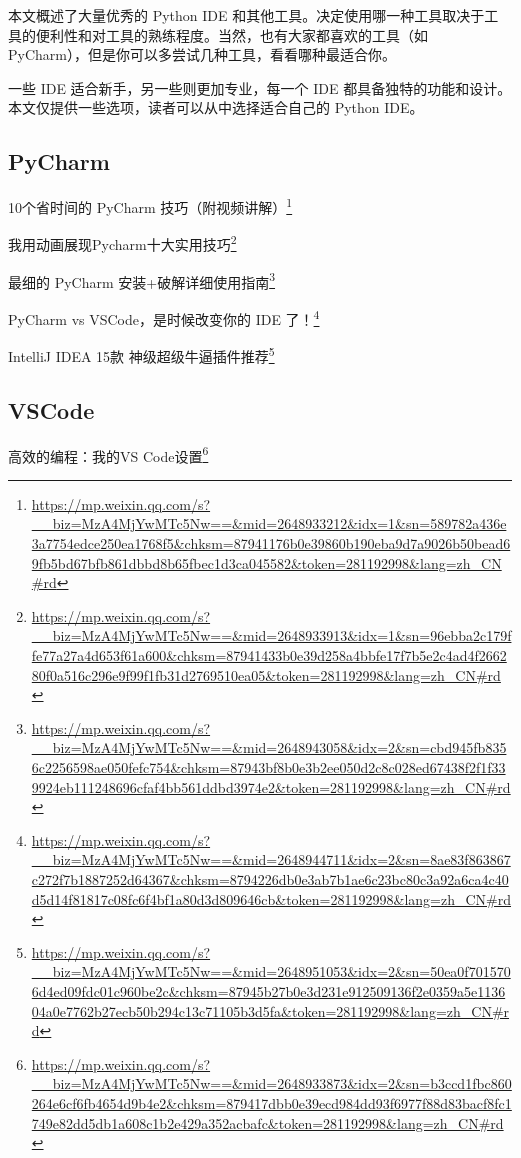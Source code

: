 \documentclass[]{ctexbook}
\renewcommand{\href}[2]{#2\footnote{\url{#1}}}
\begin{document}
本文概述了大量优秀的 Python IDE 和其他工具。决定使用哪一种工具取决于工具的便利性和对工具的熟练程度。当然，也有大家都喜欢的工具（如 PyCharm），但是你可以多尝试几种工具，看看哪种最适合你。

一些 IDE 适合新手，另一些则更加专业，每一个 IDE 都具备独特的功能和设计。本文仅提供一些选项，读者可以从中选择适合自己的 Python IDE。

\hypertarget{pycharm}{%
\subsection{PyCharm}\label{pycharm}}

\href{https://mp.weixin.qq.com/s?__biz=MzA4MjYwMTc5Nw==\&mid=2648933212\&idx=1\&sn=589782a436e3a7754edce250ea1768f5\&chksm=87941176b0e39860b190eba9d7a9026b50bead69fb5bd67bfb861dbbd8b65fbec1d3ca045582\&token=281192998\&lang=zh_CN\#rd}{10个省时间的 PyCharm 技巧（附视频讲解）}

\href{https://mp.weixin.qq.com/s?__biz=MzA4MjYwMTc5Nw==\&mid=2648933913\&idx=1\&sn=96ebba2c179ffe77a27a4d653f61a600\&chksm=87941433b0e39d258a4bbfe17f7b5e2c4ad4f266280f0a516c296e9f99f1fb31d2769510ea05\&token=281192998\&lang=zh_CN\#rd}{我用动画展现Pycharm十大实用技巧}

\href{https://mp.weixin.qq.com/s?__biz=MzA4MjYwMTc5Nw==\&mid=2648943058\&idx=2\&sn=cbd945fb8356c2256598ae050fefc754\&chksm=87943bf8b0e3b2ee050d2c8c028ed67438f2f1f339924eb111248696cfaf4bb561ddbd3974e2\&token=281192998\&lang=zh_CN\#rd}{最细的 PyCharm 安装+破解详细使用指南}

\href{https://mp.weixin.qq.com/s?__biz=MzA4MjYwMTc5Nw==\&mid=2648944711\&idx=2\&sn=8ae83f863867c272f7b1887252d64367\&chksm=8794226db0e3ab7b1ae6c23bc80c3a92a6ca4c40d5d14f81817c08fc6f4bf1a80d3d809646cb\&token=281192998\&lang=zh_CN\#rd}{PyCharm vs VSCode，是时候改变你的 IDE 了！}

\href{https://mp.weixin.qq.com/s?__biz=MzA4MjYwMTc5Nw==\&mid=2648951053\&idx=2\&sn=50ea0f7015706d4ed09fdc01c960be2c\&chksm=87945b27b0e3d231e912509136f2e0359a5e113604a0e7762b27ecb50b294c13c71105b3d5fa\&token=281192998\&lang=zh_CN\#rd}{IntelliJ IDEA 15款 神级超级牛逼插件推荐}

\hypertarget{vscode}{%
\subsection{VSCode}\label{vscode}}

\href{https://mp.weixin.qq.com/s?__biz=MzA4MjYwMTc5Nw==\&mid=2648933873\&idx=2\&sn=b3ccd1fbc860264e6cf6fb4654d9b4e2\&chksm=879417dbb0e39ecd984dd93f6977f88d83bacf8fc1749e82dd5db1a608c1b2e429a352acbafc\&token=281192998\&lang=zh_CN\#rd}{高效的编程：我的VS Code设置}
\end{document}
